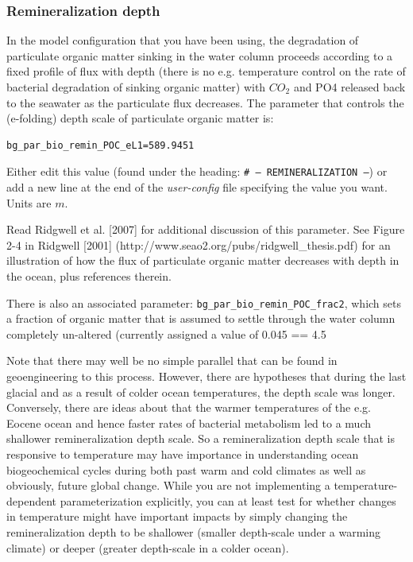 \documentclass[11pt,fleqn]{book} %
\begin{document}
\subsubsection*{Remineralization depth}

In the model configuration that you have been using, the degradation of particulate organic matter sinking in the water column proceeds according to a fixed profile of flux with depth (there is no e.g. temperature control on the rate of bacterial degradation of sinking organic matter) with \(CO_{2}\) and PO4 released back to the seawater as the particulate flux decreases. The parameter that controls the (e-folding) depth scale of particulate organic matter is:
\small\begin{verbatim}
bg_par_bio_remin_POC_eL1=589.9451
\end{verbatim}\normalsize
Either edit this value (found under the heading: \texttt{\# --- REMINERALIZATION ---}) or add a new line at the end of the \textit{user-config} file specifying the value you want. Units are \(m\).

Read Ridgwell et al. [2007] for additional discussion of this parameter. See Figure 2-4 in Ridgwell [2001] (http://www.seao2.org/pubs/ridgwell\_thesis.pdf) for an illustration of how the flux of particulate organic matter decreases with depth in the ocean, plus references therein.

There is also an associated parameter: \texttt{bg\_par\_bio\_remin\_POC\_frac2}, which sets a fraction of organic matter that is assumed to settle through the water column completely un-altered (currently assigned a value of 0.045 == 4.5%

Note that there may well be no simple parallel that can be found in geoengineering to this process. However, there are hypotheses that during the last glacial and as a result of colder ocean temperatures, the depth scale was longer. Conversely, there are ideas about that the warmer temperatures of the e.g. Eocene ocean and hence faster rates of bacterial metabolism led to a much shallower remineralization depth scale. So a remineralization depth scale that is responsive to temperature may have importance in understanding ocean biogeochemical cycles during both past warm and cold climates as well as obviously, future global change. While you are not implementing a temperature-dependent parameterization explicitly, you can at least test for whether changes in temperature might have important impacts by simply changing the remineralization depth to be shallower (smaller depth-scale under a warming climate) or deeper (greater depth-scale in a colder ocean).
\end{document}
